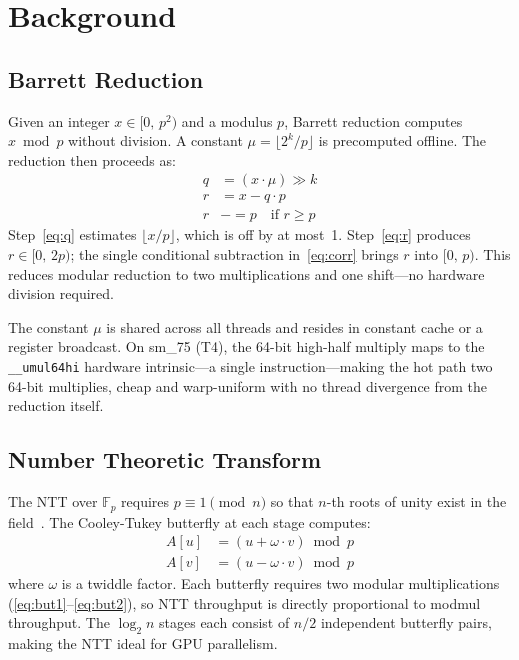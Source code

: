 \documentclass[conference]{IEEEtran}
\begin{document}
\section{Background}

\subsection{Barrett Reduction}

Given an integer $x \in [0,\,p^2)$ and a modulus $p$, Barrett reduction computes
$x \bmod p$ without division. A constant $\mu = \lfloor 2^k / p \rfloor$ is
precomputed offline. The reduction then proceeds as:
\begin{align}
  q &= (x \cdot \mu) \gg k  \label{eq:q} \\
  r &= x - q \cdot p         \label{eq:r} \\
  r &\mathrel{-}= p \quad \text{if } r \geq p \label{eq:corr}
\end{align}
Step~\eqref{eq:q} estimates $\lfloor x/p \rfloor$, which is off by at most~1.
Step~\eqref{eq:r} produces $r \in [0,\,2p)$; the single conditional subtraction
in~\eqref{eq:corr} brings $r$ into $[0,\,p)$. This reduces modular reduction to
two multiplications and one shift---no hardware division required.

The constant $\mu$ is shared across all threads and resides in constant cache or
a register broadcast. On sm\_75 (T4), the 64-bit high-half multiply maps to the
\texttt{\_\_umul64hi} hardware intrinsic---a single instruction---making the hot
path two 64-bit multiplies, cheap and warp-uniform with no thread divergence from
the reduction itself.

\subsection{Number Theoretic Transform}

The NTT over $\mathbb{F}_p$ requires $p \equiv 1 \pmod{n}$ so that $n$-th roots
of unity exist in the field~\cite{nttref}. The Cooley-Tukey butterfly at each stage computes:
\begin{align}
  A[u] &= (u + \omega \cdot v) \bmod p \label{eq:but1} \\
  A[v] &= (u - \omega \cdot v) \bmod p \label{eq:but2}
\end{align}
where $\omega$ is a twiddle factor. Each butterfly requires two modular
multiplications (\eqref{eq:but1}--\eqref{eq:but2}), so NTT throughput is
directly proportional to modmul throughput. The $\log_2 n$ stages each consist
of $n/2$ independent butterfly pairs, making the NTT ideal for GPU parallelism.
\end{document}
